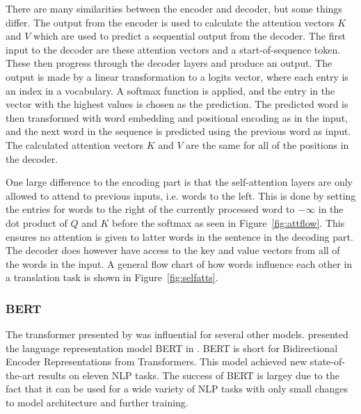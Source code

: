 There are many similarities between the encoder and decoder, but some things differ. The output from the encoder is used to calculate the attention vectors $K$ and $V$ which are used to predict a sequential output from the decoder. The first input to the decoder are these attention vectors and a start-of-sequence token. These then progress through the decoder layers and produce an output. The output is made by a linear transformation to a logits vector, where each entry is an index in a vocabulary. A softmax function is applied, and the entry in the vector with the highest values is chosen as the prediction. The predicted word is then transformed with word embedding and positional encoding as in the input, and the next word in the sequence is predicted using the previous word as input. The calculated attention vectors $K$ and $V$ are the same for all of the positions in the decoder. 

One large difference to the encoding part is that the self-attention layers are only allowed to attend to previous inputs, i.e. words to the left. This is done by setting the entries for words to the right of the currently processed word to $-\infty$ in the dot product of $Q$ and $K$ before the softmax as seen in Figure~\ref{fig:attflow}. This ensures no attention is given to latter words in the sentence in the decoding part. The decoder does however have access to the key and value vectors from all of the words in the input. A general flow chart of how words influence each other in a translation task is shown in Figure~\ref{fig:selfatts}.

\subsubsection{BERT}

The transformer presented by \citeauthor{NIPS2017_7181} was influential for several other models. \citeauthor{devlin2018bert} presented the language representation model BERT in \citeyear{devlin2018bert}. BERT is short for Bidirectional Encoder Representations from Transformers. This model achieved new state-of-the-art results on eleven NLP tasks. The success of BERT is largey due to the fact that it can be used for a wide variety of NLP tasks with only small changes to model architecture and further training.

